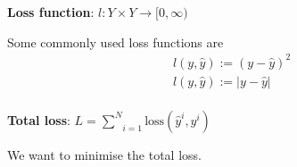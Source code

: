 \documentclass{report}
\begin{document}
\noindent \textbf{Loss function}: $l: Y\times Y \rightarrow [0,\infty)$

\noindent Some commonly used loss functions are
\begin{align}
  l(y,\hat{y}) := (y-\hat{y})^2 \\
  l(y,\hat{y}) := |y-\hat{y}|   \\
\end{align}

\noindent \textbf{Total loss}: $L = \underset{i=1}{\overset{N}{\sum}}\text{loss}(\hat{y}^i,y^i)$

\noindent We want to minimise the total loss.

\noindent
\end{document}

